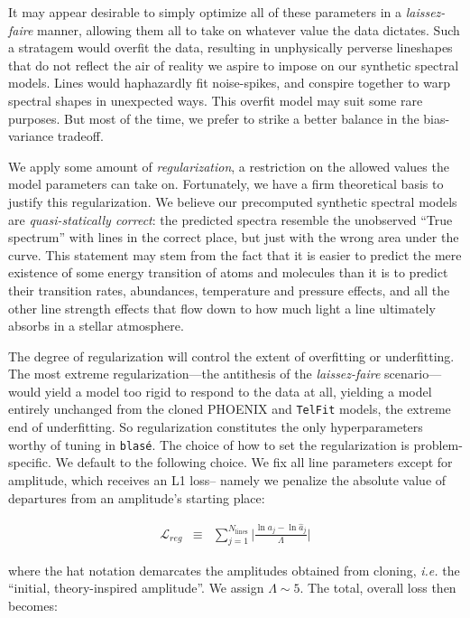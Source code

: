 \documentclass[twocolumn]{aastex631}
\begin{document}
It may appear desirable to simply optimize all of these parameters in a \emph{laissez-faire} manner, allowing them all to take on whatever value the data dictates.  Such a stratagem would overfit the data, resulting in unphysically perverse lineshapes that do not reflect the air of reality we aspire to impose on our synthetic spectral models.  Lines would haphazardly fit noise-spikes, and conspire together to warp spectral shapes in unexpected ways.  This overfit model may suit some rare purposes.  But most of the time, we prefer to strike a better balance in the bias-variance tradeoff.

We apply some amount of \emph{regularization}, a restriction on the allowed values the model parameters can take on.  Fortunately, we have a firm theoretical basis to justify this regularization.  We believe our precomputed synthetic spectral models are \emph{quasi-statically correct}: the predicted spectra resemble the unobserved ``True spectrum'' with lines in the correct place, but just with the wrong area under the curve.  This statement may stem from the fact that it is easier to predict the mere existence of some energy transition of atoms and molecules than it is to predict their transition rates, abundances, temperature and pressure effects, and all the other line strength effects that flow down to how much light a line ultimately absorbs in a stellar atmosphere.

The degree of regularization will control the extent of overfitting or underfitting. The most extreme regularization---the antithesis of the \emph{laissez-faire} scenario---would yield a model too rigid to respond to the data at all, yielding a model entirely unchanged from the cloned PHOENIX and \texttt{TelFit} models, the extreme end of underfitting.  So regularization constitutes the only hyperparameters worthy of tuning in \texttt{blas\'e}.  The choice of how to set the regularization is problem-specific.  We default to the following choice. We fix all line parameters except for amplitude, which receives an L1 loss-- namely we penalize the absolute value of departures from an amplitude's starting place:

\begin{eqnarray}
    \mathcal{L}_{reg} &\equiv& \sum_{j=1}^{N_\mathrm{lines}} \Big|\frac{\ln{a_j} - \ln{\hat{a}_j}}{\Lambda}\Big|
\end{eqnarray}

where the hat notation demarcates the amplitudes obtained from cloning, \emph{i.e.} the ``initial, theory-inspired amplitude''.  We assign $\Lambda\sim5$.  The total, overall loss then becomes:
\end{document}
